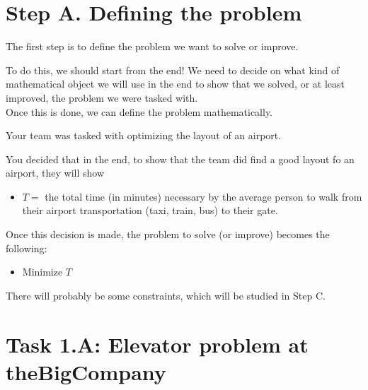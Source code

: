 \section*{Step A. Defining the problem}\label{define}

The first step is to define the problem we want to solve or improve.

To do this, we should start from the end! We need to decide on what kind of mathematical object we will use in the end to show that we solved, or at least improved, the problem we were tasked with. \\


Once this is done, we can define the problem mathematically. 

\begin{example}
	Your team was tasked with optimizing the layout of an airport.
	
	You decided that in the end, to show that the team did find a good layout fo an airport, they will show
	\begin{itemize}
		\item $T = $ the total time (in minutes) necessary by the average person to walk from their airport transportation (taxi, train, bus) to their gate.
	\end{itemize}
	
	Once this decision is made, the problem to solve (or improve) becomes the following:
	
	\begin{itemize}
		\item Minimize $T$
	\end{itemize}

	There will probably be some constraints, which will be studied in Step C.

\end{example}


\vfill


\section*{Task 1.A: Elevator problem at theBigCompany}


